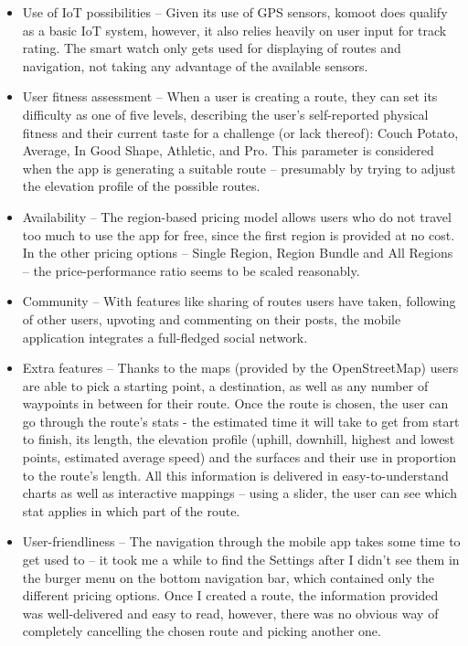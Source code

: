 \begin{itemize}
    \item Use of IoT possibilities -- Given its use of GPS sensors, komoot does qualify as a basic IoT system, however, it also relies heavily on user input for track rating.
    The smart watch only gets used for displaying of routes and navigation, not taking any advantage of the available sensors.
    \item User fitness assessment -- When a user is creating a route, they can set its difficulty as one of five levels, 
    describing the user's self-reported physical fitness and their current taste for a challenge (or lack thereof): Couch Potato, Average, In Good Shape, Athletic, and Pro.
    This parameter is considered when the app is generating a suitable route -- presumably by trying to adjust the elevation profile of the possible routes.
    \item Availability -- The region-based pricing model allows users who do not travel too much to use the app for free,
    since the first region is provided at no cost.
    In the other pricing options -- Single Region, Region Bundle and All Regions -- the price-performance ratio seems to be scaled reasonably. 
    \item Community -- With features like sharing of routes users have taken, following of other users, upvoting and commenting on their posts, the mobile application integrates a full-fledged social network.
    \item Extra features -- Thanks to the maps (provided by the OpenStreetMap) users are able to pick a starting point, a destination, as well as any number of waypoints in between for their route.
    Once the route is chosen, the user can go through the route's stats - the estimated time it will take to get from start to finish, its length, the elevation profile (uphill, downhill, highest and lowest points, estimated average speed) and the surfaces and their use in proportion to the route's length.
    All this information is delivered in easy-to-understand charts as well as interactive mappings -- using a slider, the user can see which stat applies in which part of the route.
    \item User-friendliness -- The navigation through the mobile app takes some time to get used to -- it took me a while to find the Settings after I didn't see them in the burger menu on the bottom navigation bar, which contained only the different pricing options.
    Once I created a route, the information provided was well-delivered and easy to read, however, there was no obvious way of completely cancelling the chosen route and picking another one.

\end{itemize}
